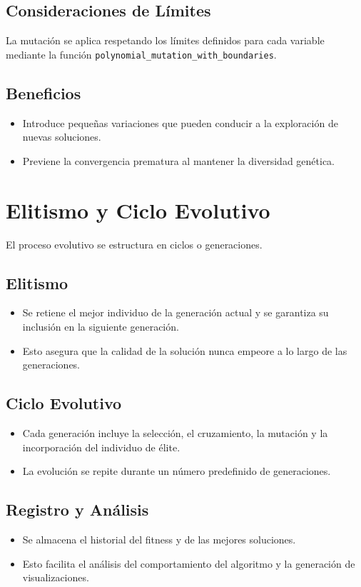 \subsection*{Consideraciones de L\'imites}
La mutaci\'on se aplica respetando los l\'imites definidos para cada variable mediante la funci\'on \texttt{polynomial\_mutation\_with\_boundaries}.

\subsection*{Beneficios}
\begin{itemize}
    \item Introduce peque\~nas variaciones que pueden conducir a la exploraci\'on de nuevas soluciones.
    \item Previene la convergencia prematura al mantener la diversidad gen\'etica.
\end{itemize}

\section{Elitismo y Ciclo Evolutivo}

El proceso evolutivo se estructura en ciclos o generaciones.

\subsection*{Elitismo}
\begin{itemize}
    \item Se retiene el mejor individuo de la generaci\'on actual y se garantiza su inclusi\'on en la siguiente generaci\'on.
    \item Esto asegura que la calidad de la soluci\'on nunca empeore a lo largo de las generaciones.
\end{itemize}

\subsection*{Ciclo Evolutivo}
\begin{itemize}
    \item Cada generaci\'on incluye la selecci\'on, el cruzamiento, la mutaci\'on y la incorporaci\'on del individuo de \'elite.
    \item La evoluci\'on se repite durante un n\'umero predefinido de generaciones.
\end{itemize}

\subsection*{Registro y An\'alisis}
\begin{itemize}
    \item Se almacena el historial del fitness y de las mejores soluciones.
    \item Esto facilita el an\'alisis del comportamiento del algoritmo y la generaci\'on de visualizaciones.
\end{itemize}
